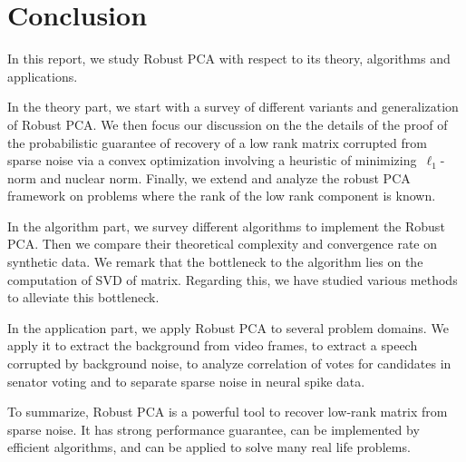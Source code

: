 \section*{Conclusion}

In this report, we study Robust PCA with respect to its theory, algorithms and applications.

In the theory part, we start with a survey of different variants and generalization of Robust PCA. We then focus our discussion on the the details of the proof of the probabilistic guarantee of recovery of a low rank matrix corrupted from sparse noise via a convex optimization involving a heuristic of minimizing~$\ell_1$-norm and nuclear norm. Finally, we extend and analyze the robust PCA framework on problems where the rank of the low rank component is known.   

In the algorithm part, we survey different algorithms to implement the Robust PCA. Then we compare their theoretical complexity and convergence rate on synthetic data. We remark that the bottleneck to the algorithm lies on the computation of SVD of matrix. Regarding this, we have studied various methods to alleviate this bottleneck. 

In the application part, we apply Robust PCA to several problem domains. We apply it to extract the background from video frames, to extract a speech corrupted by background noise, to analyze correlation of votes for candidates in senator voting and to separate sparse noise in neural spike data. 

To summarize, Robust PCA is a powerful tool to recover low-rank matrix from sparse noise. It has strong performance guarantee, can be implemented by efficient algorithms, and can be applied to solve many real life problems. 